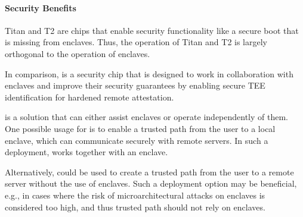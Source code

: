 \paragraph{Security Benefits}
Titan and T2 are chips that enable security functionality like a secure boot that is missing from enclaves. Thus, the operation of Titan and T2 is largely orthogonal to the operation of enclaves. 

In comparison, \proximitee is a security chip that is designed to work in collaboration with enclaves and improve their security guarantees by enabling secure TEE identification for hardened remote attestation. 

\protection is a solution that can either assist enclaves or operate independently of them. One possible usage for \protection is to enable a trusted path from the user to a local enclave, which can communicate securely with remote servers. In such a deployment, \protection works together with an enclave. 

Alternatively, \protection could be used to create a trusted path from the user to a remote server without the use of enclaves. Such a deployment option may be beneficial, e.g., in cases where the risk of microarchitectural attacks on enclaves is considered too high, and thus trusted path should not rely on enclaves.


